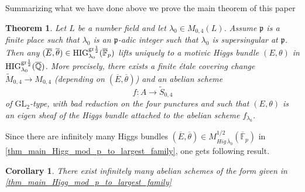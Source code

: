 \documentclass[12pt,twoside]{book}
\theoremstyle{plain}
\newtheorem{theorem}{Theorem}[section]
\newtheorem{corollary}[corollary]{Corollary}
\theoremstyle{definition}
\theoremstyle{remark}
\newcommand{\frakp}{{\mathfrak p}}
\numberwithin{equation}{section}
\def\barFp{{\overline{\mathbb F}_p}}
\begin{document}
Summarizing what we have done above we prove the main theorem of this paper
\begin{theorem} \label{thm_Higgs_k_to_family_M04} \label{thm_main_Higg_mod_p_to_largest_family}
Let $L$ be a number field and let $\lambda_0 \in M_{0,4}(L)$. Assume $\frakp$ is a finite place such that $\lambda_0$ is an $\frakp$-adic integer such that $\lambda_0$ is supersingular at $\frakp$. Then any
$(\overline E,\overline\theta)\in \mathrm{HIG}_{\lambda_0}^{{\rm gr}{1\over2}}(\barFp)$ lifts uniquely to a motivic Higgs bundle $(E,\theta)$ in $\mathrm{HIG}_{\lambda_0}^{{\rm gr}{1\over2}}(\overline{\mathbb Q})$. More precisely, there exists a finite \'etale covering change $\widetilde M_{0,4}\to M_{0,4}$ (depending on $(\overline{E},\overline{\theta})$) and an abelian scheme
\[f\colon A\to \widetilde S_{0,4}\]
of $\text{GL}_2$-type,
with bad reduction on the four punctures and such that
$(E,\theta)$ is an eigen sheaf of the Higgs bundle attached to the abelian scheme $f_{\lambda_0}$.
\end{theorem}

Since there are infinitely many Higgs bundles $(\overline E,\overline\theta)\in M^{1/2}_{Hig\,\overline\lambda_0}(\overline{\mathbb F}_p)$ in \autoref{thm_main_Higg_mod_p_to_largest_family}, one gets following result.
\begin{corollary}
There exist infinitely many abelian schemes of the form given in \autoref{thm_main_Higg_mod_p_to_largest_family}
\end{corollary}
\end{document}
